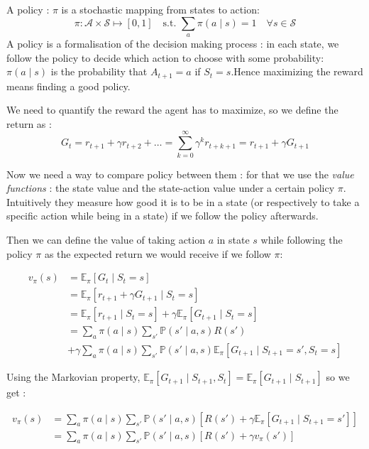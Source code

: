 \documentclass[14pt,a4paper]{article}
\theoremstyle{definition}
\begin{document}
A policy : $\pi $ is a stochastic mapping from states to action: $$ \pi : \mathcal{A} \times \mathcal{S} \mapsto [0,1] \quad \text{s.t. } \sum_{a}\pi(a\mid s)=1 \quad \forall s \in \mathcal{S}$$
A policy is a formalisation of the decision making process : in each state, we follow the policy to decide which action to choose with some probability: $\pi(a\mid s) $ is the probability that $A_{t+1}=a$ if $S_t=s$.Hence maximizing the reward means finding a good policy.


We need to quantify the reward the agent has to maximize, so we define the return as : 
$$G_t= r_{t+1}+\gamma r_{t+2}+ \dots = \sum_{k=0}^{\infty}\gamma^{k}r_{t+k+1} = r_{t+1} + \gamma G_{t+1} $$





Now we need a way to compare policy between them : for that we use the \emph{value functions} : the state value and the state-action value under a certain policy $\pi$. Intuitively they measure how good it is to be in a state (or respectively to take a specific action while being in a state) if we follow the policy afterwards.


Then we can define the value of taking action $a$ in state $s$ while following the policy $\pi$ as the expected return we would receive if we follow $\pi$:


\begin{equation*}
\begin{split}
v_{\pi}(s)&= \mathbb{E}_{\pi}[G_t \mid S_t=s]
\\&=\mathbb{E}_{\pi}\left[ r_{t+1} + \gamma G_{t+1} \mid S_t = s\right]
\\&=\mathbb{E}_{\pi}\left[ r_{t+1} \mid S_t = s \right] + \gamma \mathbb{E}_{\pi}\left[G_{t+1} \mid S_t = s \right]
\\&=\sum_{a}\pi(a \mid s)\sum_{s'}\mathbb{P}(s' \mid a,s)R(s') 
\\&+ \gamma \sum_{a}\pi(a \mid s)\sum_{s'}\mathbb{P}(s'\mid a,s)\mathbb{E}_{\pi}\left[G_{t+1} \mid S_{t+1} = s', S_{t}= s\right]
\end{split}
\end{equation*}

Using the Markovian property, $\mathbb{E}_{\pi}\left[G_{t+1} \mid S_{t+1}, S_{t}\right] = \mathbb{E}_{\pi}\left[G_{t+1} \mid S_{t+1}\right] $ so we get : 

\begin{equation}
\begin{split}
v_{\pi}(s)&= \sum_{a}\pi(a \mid s)\sum_{s'}\mathbb{P}(s'\mid a,s)\left[R(s') +\gamma \mathbb{E}_{\pi}\left[  G_{t+1} \mid S_{t+1}=s'  \right]\right]
\\&=\sum_{a}\pi(a \mid s)\sum_{s'}\mathbb{P}(s'\mid a,s)\left[R(s') + \gamma v_{\pi}(s')\right]
\end{split}
\label{v(s)}
\end{equation}
\end{document}
